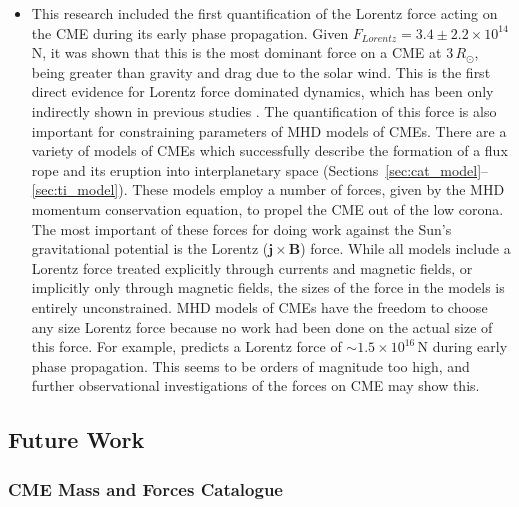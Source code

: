\begin{itemize}
\item This research included the first quantification of the Lorentz force acting on the CME during its early phase propagation. Given $F_{Lorentz} = 3.4\pm2.2\times10^{14}$\,N, it was shown that this is the most dominant force on a CME at $3\,R_{\odot}$, being greater than gravity and drag due to the solar wind. This is the first direct evidence for Lorentz force dominated dynamics, which has been only indirectly shown in previous studies \citep{bein2011}. The quantification of this force is also important for constraining parameters of MHD models of CMEs. There are a variety of models of CMEs which successfully describe the formation of a flux rope and its eruption into interplanetary space (Sections~\ref{sec:cat_model}--\ref{sec:ti_model}). These models employ a number of forces, given by the MHD momentum conservation equation, to propel the CME out of the low corona. The most important of these forces for doing work against the Sun's gravitational potential is the Lorentz ($\mathbf{j}\times\mathbf{B}$) force. While all models include a Lorentz force treated explicitly through currents and magnetic fields, or implicitly only through magnetic fields, the sizes of the force in the models is entirely unconstrained. MHD models of CMEs have the freedom to choose any size Lorentz force because no work had been done on the actual size of this force. For example, \citet{chen1996} predicts a Lorentz force of $\sim$$1.5\times10^{16}$\,N during early phase propagation. This seems to be orders of magnitude too high, and further observational investigations of the forces on CME may show this.

\end{itemize}

\subsection{Future Work}

\subsubsection{CME Mass and Forces Catalogue}

